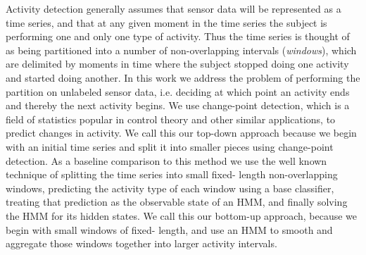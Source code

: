 Activity detection generally assumes that sensor data will be represented as a
time series, and that at any given moment in the time series the subject is
performing one and only one type of activity. Thus the time series is thought
of as being partitioned into a number of non-overlapping intervals (\emph{windows}), which are
delimited by moments in time where the subject stopped doing one activity and
started doing another. In this work we address the problem of performing the
partition on unlabeled sensor data, i.e. deciding at which point an activity ends and 
thereby the next activity begins. We use change-point detection, which is a
field of statistics popular in control theory and other similar applications,
to predict changes in activity. We call this our top-down approach because we
begin with an initial time series and split it into smaller pieces using
change-point detection.
As a baseline comparison to this method we
use the well known technique of splitting the time series into small fixed-
length non-overlapping windows, predicting the activity type of each window
using a base classifier, treating that prediction as the observable
state of an HMM, and finally solving the HMM for its hidden states. We call
this our bottom-up approach, because we begin with small windows of fixed-
length, and use an HMM to smooth and aggregate those windows together into
larger activity intervals.
